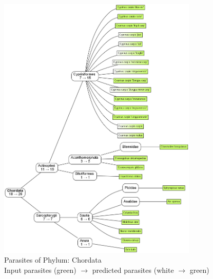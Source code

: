       \begin{figure}[h!]
        \centering
        \includegraphics[trim = 0mm 0mm 0mm 0mm, clip, width=0.85\textwidth]{Figures/ChordataParasites.png}
        \caption{Parasites of Phylum: Chordata \\ 
          Input parasites (green) $\rightarrow$ predicted parasites (white $\rightarrow$ green)}
        \label{fig:ChordataParasites}
      \end{figure}

